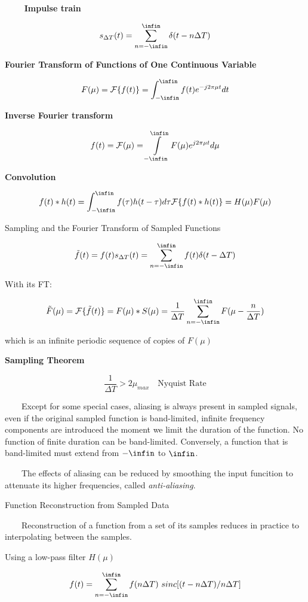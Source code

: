 \documentclass[]{article}
\begin{document}
\(\quad\quad\) \textbf{Impulse train}

\[s_{\Delta T}(t)=\sum\limits^{\infin}_{n=-\infin}\delta(t-n\Delta T)\]

\textbf{Fourier Transform of Functions of One Continuous Variable}

\[F(\mu)=\mathcal{F}\{f(t)\}=\int^{\infin}_{-\infin}f(t)e^{-j2\pi \mu t}dt\]

\textbf{Inverse Fourier transform}

\[f(t)=\mathcal{F(\mu)}=\int\limits^{\infin}_{-\infin}F(\mu)e^{j2\pi \mu t}d\mu\]

\textbf{Convolution}

\[f(t)*h(t)=\int^{\infin}_{-\infin}f(\tau)h(t-\tau)d\tau\\
\mathcal{F}\{f(t)*h(t)\}=H(\mu)F(\mu)\]

Sampling and the Fourier Transform of Sampled Functions

\[\tilde{f}(t)=f(t)s_{\Delta T}(t)=\sum\limits^{\infin}_{n=-\infin}f(t)\delta(t-\Delta T)\]

With its FT:

\[\tilde{F}(\mu)=\mathcal{F}\{\tilde{f}(t)\}=F(\mu)*S(\mu)=\dfrac{1}{\Delta T}\sum\limits^{\infin}_{n=-\infin}F(\mu - \dfrac{n}{\Delta T})\]

which is an infinite periodic sequence of copies of \(F(\mu)\)

\textbf{Sampling Theorem}

\[\dfrac{1}{\Delta T}>2\mu_{max}\quad \text{Nyquist Rate}\]

\(\quad\quad\)Except for some special cases, aliasing is always present
in sampled signals, even if the original sampled function is
band-limited, infinite frequency components are introduced the moment we
limit the duration of the function. No function of finite duration can
be band-limited. Conversely, a function that is band-limited must extend
from \(-\infin\) to \(\infin\).

\(\quad\quad\)The effects of aliasing can be reduced by smoothing the
input funcition to attenuate its higher frequencies, called
\emph{anti-aliasing}.

Function Reconstruction from Sampled Data

\(\quad\quad\)Reconstruction of a function from a set of its samples
reduces in practice to interpolating between the samples.

Using a low-pass filter \(H(\mu)\)

\[f(t)=\sum\limits^{\infin}_{n=-\infin}f(n\Delta T)\ sinc[(t-n\Delta T)/n\Delta T]\]
\end{document}
